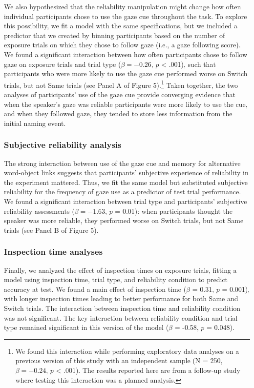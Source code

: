 \documentclass[oneside]{report}
\begin{document}
We also hypothesized that the reliability manipulation might change how
often individual participants chose to use the gaze cue throughout the
task. To explore this possibility, we fit a model with the same
specifications, but we included a predictor that we created by binning
participants based on the number of exposure trials on which they chose
to follow gaze (i.e., a gaze following score). We found a significant
interaction between how often participants chose to follow gaze on
exposure trials and trial type (\(\beta = -0.26\), \(p\) \textless{}
.001), such that participants who were more likely to use the gaze cue
performed worse on Switch trials, but not Same trials (see Panel A of
Figure 5).\footnote{We found this interaction while performing
  exploratory data analyses on a previous version of this study with an
  independent sample (N = 250, \(\beta = -0.24\), \(p\) \textless{}
  .001). The results reported here are from a follow-up study where
  testing this interaction was a planned analysis.} Taken together, the
two analyses of participants' use of the gaze cue provide converging
evidence that when the speaker's gaze was reliable participants were
more likely to use the cue, and when they followed gaze, they tended to
store less information from the initial naming event.

\subsubsection{Subjective reliability
analysis}\label{subjective-reliability-analysis}

The strong interaction between use of the gaze cue and memory for
alternative word-object links suggests that participants' subjective
experience of reliability in the experiment mattered. Thus, we fit the
same model but substituted subjective reliability for the frequency of
gaze use as a predictor of test trial performance. We found a
significant interaction between trial type and participants' subjective
reliability assessments (\(\beta = -1.63\), \(p\) = 0.01): when
participants thought the speaker was more reliable, they performed worse
on Switch trials, but not Same trials (see Panel B of Figure 5).

\subsubsection{Inspection time analyses}\label{inspection-time-analyses}

Finally, we analyzed the effect of inspection times on exposure trials,
fitting a model using inspection time, trial type, and reliability
condition to predict accuracy at test. We found a main effect of
inspection time (\(\beta\) = 0.31, \(p\) = 0.001), with longer
inspection times leading to better performance for both Same and Switch
trials. The interaction between inspection time and reliability
condition was not significant. The key interaction between reliability
condition and trial type remained significant in this version of the
model (\(\beta\) = -0.58, \(p\) = 0.048).
\end{document}
